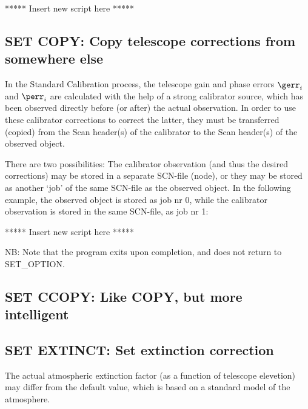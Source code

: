 ***** Insert new script here *****


\subsection{SET COPY: Copy telescope corrections from somewhere else}
\label{.set.copy}

In the Standard Calibration process, the telescope gain and phase errors
$\gerr_{i}$ and $\perr_{i}$ are calculated with the help of a strong calibrator
source, which has been observed directly before (or after) the actual
observation. In order to use these calibrator corrections to correct the
latter, they must be transferred (copied) from the Scan header(s) of the
calibrator to the Scan header(s) of the observed object.

There are two possibilities: The calibrator observation (and thus the desired
corrections) may be stored in a separate SCN-file (node), or they may be stored
as another `job' of the same SCN-file as the observed object. In the following
example, the observed object is stored as job nr 0, while the calibrator
observation is stored in the same SCN-file, as job nr 1:


***** Insert new script here *****

NB: Note that the program exits upon completion, and does not return to
SET\_OPTION.

\subsection{SET CCOPY: Like COPY, but more intelligent}
\label{.set.ccopy}




\subsection{SET EXTINCT: Set extinction correction}
\label{.set.extinct}

The actual atmospheric extinction factor (as a function of telescope elevetion)
may differ from the default value, which is based on a standard model of the
atmosphere.


